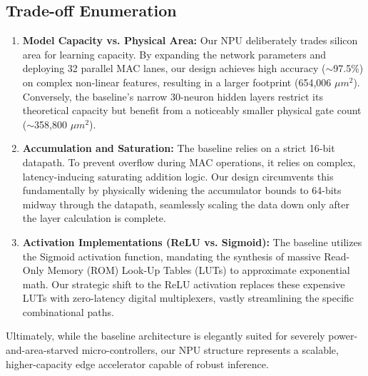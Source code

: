 \subsection{Trade-off Enumeration}
\begin{enumerate}
    \item \textbf{Model Capacity vs. Physical Area:} Our NPU deliberately trades silicon area for learning capacity. By expanding the network parameters and deploying 32 parallel MAC lanes, our design achieves high accuracy ($\sim$97.5\%) on complex non-linear features, resulting in a larger footprint (654,006 $\mu m^2$). Conversely, the baseline's narrow 30-neuron hidden layers restrict its theoretical capacity but benefit from a noticeably smaller physical gate count ($\sim$358,800 $\mu m^2$).
    
    \item \textbf{Accumulation and Saturation:} The baseline relies on a strict 16-bit datapath. To prevent overflow during MAC operations, it relies on complex, latency-inducing saturating addition logic. Our design circumvents this fundamentally by physically widening the accumulator bounds to 64-bits midway through the datapath, seamlessly scaling the data down only after the layer calculation is complete.
    
    \item \textbf{Activation Implementations (ReLU vs. Sigmoid):} The baseline utilizes the Sigmoid activation function, mandating the synthesis of massive Read-Only Memory (ROM) Look-Up Tables (LUTs) to approximate exponential math. Our strategic shift to the ReLU activation replaces these expensive LUTs with zero-latency digital multiplexers, vastly streamlining the specific combinational paths.
\end{enumerate}

Ultimately, while the baseline architecture is elegantly suited for severely power-and-area-starved micro-controllers, our NPU structure represents a scalable, higher-capacity edge accelerator capable of robust inference.

